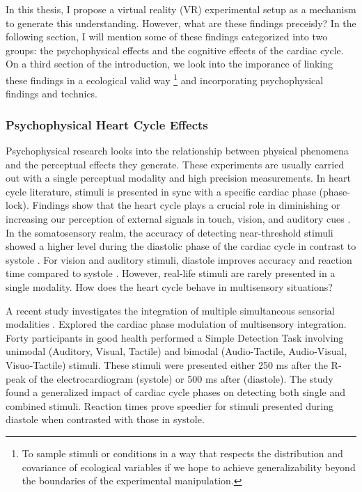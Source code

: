 \documentclass[12pt,oneside,openright]{report}
\begin{document}
In this thesis, I propose a virtual reality (VR) experimental setup as a mechanism to generate this understanding. However, what are these findings preceisly? In the following section, I will mention some of these findings categorized into two groups: the psychophysical effects and the cognitive effects of the cardiac cycle. On a third section of the introduction, we look into the imporance of linking these findings in a ecological valid way \footnote{To sample stimuli or conditions in a way that respects the distribution and covariance of ecological variables if we hope to achieve generalizability beyond the boundaries of the experimental manipulation.\parencite{NASTASE2020117254}} and incorporating psychophysical findings and technics.

\subsubsection*{Psychophysical Heart Cycle Effects}

Psychophysical research looks into the relationship between physical phenomena and the perceptual effects they generate. These experiments are usually carried out with a single perceptual modality and high precision measurements. In heart cycle literature, stimuli is presented in sync with a specific cardiac phase (phase-lock). Findings show that the heart cycle plays a crucial role in diminishing or increasing our perception of external signals in touch, vision, and auditory cues \parencite{SALTAFOSSI2023108642}. In the somatosensory realm, the accuracy of detecting near-threshold stimuli showed a higher level during the diastolic phase of the cardiac cycle in contrast to systole \parencite{esra_p, AL2021118247, Grund643, motyka}. For vision and auditory stimuli, diastole improves accuracy and reaction time compared to systole \parencite{SALTAFOSSI2023108642}. However, real-life stimuli are rarely presented in a single modality. How does the heart cycle behave in multisensory situations?

A recent study investigates the integration of multiple simultaneous sensorial modalities \parencite{SALTAFOSSI2023108642}. Explored the cardiac phase modulation of multisensory integration. Forty participants in good health performed a Simple Detection Task involving unimodal (Auditory, Visual, Tactile) and bimodal (Audio-Tactile, Audio-Visual, Visuo-Tactile) stimuli. These stimuli were presented either 250 ms after the R-peak of the electrocardiogram (systole) or 500 ms after (diastole). The study found a generalized impact of cardiac cycle phases on detecting both single and combined stimuli. Reaction times prove speedier for stimuli presented during diastole when contrasted with those in systole.
\end{document}
